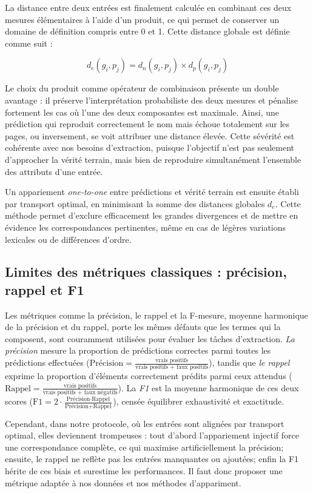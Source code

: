La distance entre deux entrées est finalement calculée en combinant ces deux mesures élémentaires à l’aide d’un produit, ce qui permet de conserver un domaine de définition compris entre 0 et 1. Cette distance globale est définie comme suit :

$$
d_e(g_i, p_j) = d_n(g_i, p_j) \times d_p(g_i, p_j)
$$

Le choix du produit comme opérateur de combinaison présente un double avantage : il préserve l’interprétation probabiliste des deux mesures et pénalise fortement les cas où l’une des deux composantes est maximale. Ainsi, une prédiction qui reproduit correctement le nom mais échoue totalement sur les pages, ou inversement, se voit attribuer une distance élevée. Cette sévérité est cohérente avec nos besoins d’extraction, puisque l’objectif n’est pas seulement d’approcher la vérité terrain, mais bien de reproduire simultanément l’ensemble des attributs d’une entrée.

Un appariement \emph{one-to-one} entre prédictions et vérité terrain est ensuite établi par transport optimal, en minimisant la somme des distances globales $d_e$. Cette méthode permet d’exclure efficacement les grandes divergences et de mettre en évidence les correspondances pertinentes, même en cas de légères variations lexicales ou de différences d’ordre.

\subsection{Limites des métriques classiques : précision, rappel et F1}

Les métriques comme la précision, le rappel et la F-mesure, moyenne harmonique de la précision et du rappel, porte les mêmes défauts que les termes qui la composent, sont couramment utilisées pour évaluer les tâches d’extraction. \emph{La précision} mesure la proportion de prédictions correctes parmi toutes les prédictions effectuées ($\text{Précision} = \frac{\text{vrais positifs}}{\text{vrais positifs + faux positifs}}$), tandis que \emph{le rappel} exprime la proportion d’éléments correctement prédits parmi ceux attendus ($\text{Rappel} = \frac{\text{vrais positifs}}{\text{vrais positifs + faux négatifs}}$). La \emph{F1} est la moyenne harmonique de ces deux scores ($\text{F1} = 2 \cdot \frac{\text{Précision} \cdot \text{Rappel}}{\text{Précision}+\text{Rappel}}$), censée équilibrer exhaustivité et exactitude.

Cependant, dans notre protocole, où les entrées sont alignées par transport optimal, elles deviennent trompeuses : tout d'abord l’appariement injectif force une correspondance complète, ce qui maximise artificiellement la précision; ensuite, le rappel ne reflète pas les entrées manquantes ou ajoutées; enfin la F1 hérite de ces biais et surestime les performances. Il faut donc proposer une métrique adaptée à nos données et nos méthodes d'appariment.

